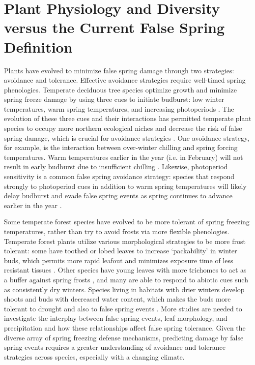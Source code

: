 \documentclass{article}\usepackage[]{graphicx}\usepackage[]{color}
\begin{document}
\section {Plant Physiology and Diversity versus the Current False Spring Definition}
Plants have evolved to minimize false spring damage through two strategies: avoidance and tolerance. Effective avoidance strategies require well-timed spring phenologies. Temperate deciduous tree species optimize growth and minimize spring freeze damage by using three cues to initiate budburst: low winter temperatures, warm spring temperatures, and increasing photoperiods \citep{Chuine2010}. The evolution of these three cues and their interactions has permitted temperate plant species to occupy more northern ecological niches and decrease the risk of false spring damage, which is crucial for avoidance strategies \citep{Samish1954}. One avoidance strategy, for example, is the interaction between over-winter chilling and spring forcing temperatures. Warm temperatures earlier in the year (i.e. in February) will not result in early budburst due to insufficient chilling \citep{Basler2012}. Likewise, photoperiod sensitivity is a common false spring avoidance strategy: species that respond strongly to photoperiod cues in addition to warm spring temperatures will likely delay budburst and evade false spring events as spring continues to advance earlier in the year \citep{Basler2014}. 

Some temperate forest species have evolved to be more tolerant of spring freezing temperatures, rather than try to avoid frosts via more flexible phenologies. Temperate forest plants utilize various morphological strategies to be more frost tolerant: some have toothed or lobed leaves to increase `packability' in winter buds, which permits more rapid leafout and minimizes exposure time of less resistant tissues \citep{Edwards2017}. Other species have young leaves with more trichomes to act as a buffer against spring frosts \citep{Agrawal2004, Prozherina2003}, and many are able to respond to abiotic cues such as consistently dry winters. Species living in habitats with drier winters develop shoots and buds with decreased water content, which makes the buds more tolerant to drought and also to false spring events \citep{Beck2007, Morin2007, Nielsen2009, Poirier2010, Kathke2011, Hofmann2015}. More studies are needed to investigate the interplay between false spring events, leaf morphology, and precipitation and how these relationships affect false spring tolerance. Given the diverse array of spring freezing defense mechanisms, predicting damage by false spring events requires a greater understanding of avoidance and tolerance strategies across species, especially with a changing climate.
\end{document}
